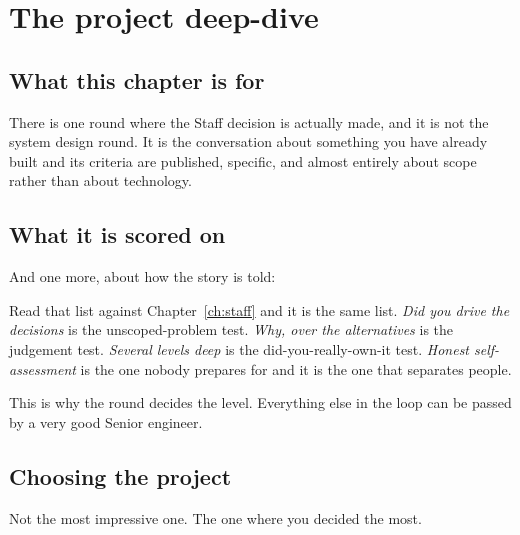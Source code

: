 \chapter{The project deep-dive}
\label{ch:deep-dive}

\section*{What this chapter is for}

There is one round where the Staff decision is actually made, and it is not the
system design round. It is the conversation about something you have already
built \dash{} and its criteria are published, specific, and almost entirely
about scope rather than about technology.

\section{What it is scored on}


And one more, about how the story is told: 

\begin{kitnote}
Read that list against Chapter~\ref{ch:staff} and it is the same list. \emph{Did
you drive the decisions} is the unscoped-problem test. \emph{Why, over the
alternatives} is the judgement test. \emph{Several levels deep} is the
did-you-really-own-it test. \emph{Honest self-assessment} is the one nobody
prepares for and it is the one that separates people.

This is why the round decides the level. Everything else in the loop can be
passed by a very good Senior engineer.
\end{kitnote}

\section{Choosing the project}

Not the most impressive one. The one where you decided the most.

